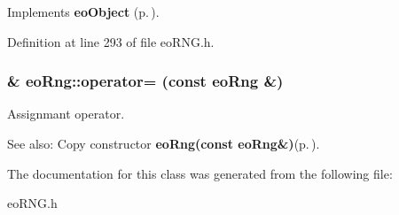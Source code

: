 Implements {\bf eo\-Object} {\rm (p.\,\pageref{classeo_object_a1})}.

Definition at line 293 of file eo\-RNG.h.
\subsubsection{\& eo\-Rng::operator= (const {\bf eo\-Rng} \&)\hspace{0.3cm}{\tt  [private]}}\label{classeo_rng_d3}


Assignmant operator. 

\begin{Desc}
\item[See also:]Copy constructor {\bf eo\-Rng(const eo\-Rng\&)}{\rm (p.\,\pageref{classeo_rng_d2})}. \end{Desc}


The documentation for this class was generated from the following file:\begin{CompactItemize}
\item 
eo\-RNG.h\end{CompactItemize}
